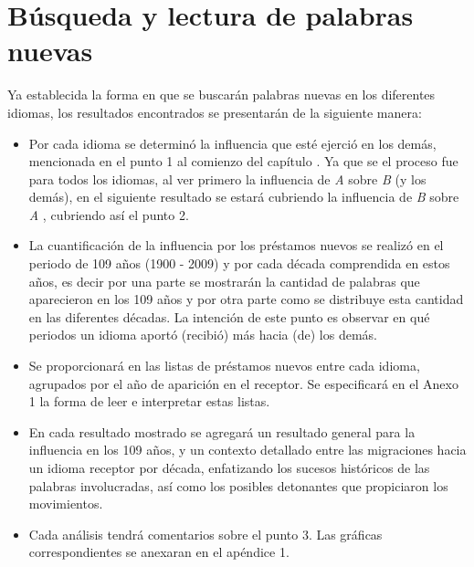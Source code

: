 \section{Búsqueda y lectura de palabras nuevas} %
Ya establecida la forma en que se buscarán  palabras nuevas en los diferentes
idiomas,  los resultados encontrados se presentarán de la siguiente manera:
\begin{itemize}
\item Por cada idioma se determinó la influencia que esté ejerció en los demás,
mencionada en el punto 1 al comienzo del capítulo . Ya que
se el proceso fue
para todos los idiomas,  al ver primero la influencia de \textit{A} sobre
\textit{B}  (y los demás),  en el siguiente resultado se estará cubriendo la
influencia  de \textit{B}  sobre \textit{A} , cubriendo así el punto 2. 
 
\item La cuantificación de la influencia por los préstamos nuevos se realizó en
el periodo de 109 años (1900 - 2009) y por cada década comprendida en estos
años, es decir por una parte se mostrarán la cantidad de palabras que
aparecieron en los 109 años y por otra parte como se distribuye esta cantidad
en las diferentes décadas.  La intención de este punto es observar en qué
periodos un idioma aportó (recibió) más  hacia (de) los demás.
\item Se proporcionará en \cite{prestamos_nuevos} las listas  de préstamos
nuevos entre cada idioma, agrupados por el año de aparición en el receptor.  Se
especificará en el Anexo 1  la forma de leer e interpretar estas listas.
\item En cada resultado mostrado se agregará un resultado general para la
influencia en los 109 años, y un contexto detallado entre las migraciones hacia
un idioma receptor por década,  enfatizando los sucesos históricos de las
palabras involucradas, así como los posibles detonantes que propiciaron los
movimientos. 
\item Cada análisis tendrá comentarios sobre el punto 3. Las gráficas
correspondientes se anexaran en el apéndice 1.
\end{itemize}



